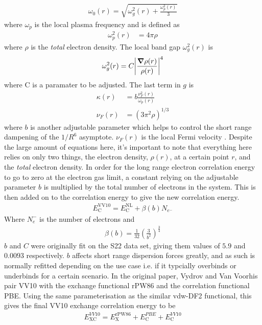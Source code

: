 \documentclass[10pt,a4paper,twocolumn,twoside]{extarticle}
\begin{document}
	\begin{align}
		\omega_0(r) = \sqrt{ \omega_g^2(r) + \frac{\omega_p^2(r)}{3}} 
	\end{align}
	where $\omega_p$ is the local plasma frequency and is defined as 
	\begin{align}
		\omega_p^2(r) &= 4\pi \rho
	\end{align}
	where $\rho$ is the \emph{total} electron density. The local band gap $\omega_g^2(r)$ is 
	\begin{align}
		\omega_g^2(r) = C \absolutevalue{\frac{\grad \rho(r)}{\rho(r)}}^4
	\end{align}
	where C is a paramater to be adjusted. The last term in $g$ is
	\begin{align}
		\kappa(r) &= b \frac{\nu_F^2(r)}{\omega_p(r)} \\
		\nu_F(r) &= (3 \pi^2 \rho)^{1/3}
	\end{align}
	where $b$ is another adjustable parameter which helps to control the short range dampening of the $1/R^6$ asymptote. $\nu_F(r)$ is the local Fermi velocity . 
	Despite the large amount of equations here, it's important to note that everything here relies on only two things, the electron density, $\rho(r)$, at a certain point $r$, and the \emph{total} electron density. 
	In order for the long range electron correlation energy to go to zero at the electron gas limit, a constant relying on the adjustable parameter $b$ is multiplied by the total number of electrons in the system. This is then added on to the correlation energy to give the new correlation energy.
	\begin{align}
		E_\text{C}^\text{VV10} = E_\text{C}^\text{NL} + \beta (b)N_{e^-}
	\end{align}
	Where $N_e^-$ is the number of electrons and 
	\begin{align}
		\beta(b) = \frac{1}{32} \left(\frac{3}{b^2}\right)^{\frac{3}{4}}
	\end{align}
	$b$ and $C$ were originally fit on the S22 data set, giving them values of $5.9$ and $0.0093$ respectively.\cite{Vydrov2012} $b$ affects short range dispersion forces greatly, and as such is normally refitted depending on the use case i.e. if it typcially overbinds or underbinds for a certain scenario.
	In the original paper, Vydrov and Van Voorhis pair VV10 with the exchange functional rPW86 and the correlation functional PBE. Using the same parameterisation as the similar vdw-DF2 functional, this gives the final VV10 exchange correlation energy to be 
	\begin{align}
		E_\text{XC}^{VV10} = E_\text{X}^\text{rPW86} + E_\text{C}^{PBE} + E_\text{C}^{VV10}
	\end{align} 
\end{document}
